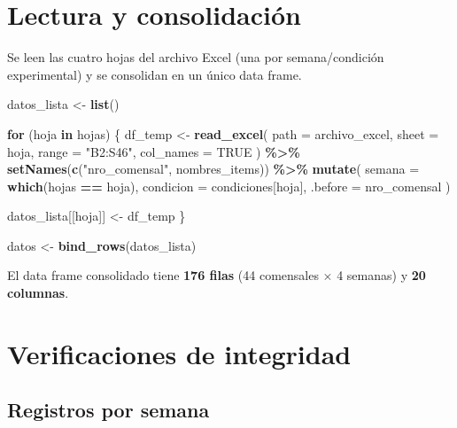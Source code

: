 \documentclass[
  spanish,
]{article}
\newenvironment{Shaded}{\begin{snugshade}}{\end{snugshade}}
\newcommand{\AttributeTok}[1]{\textcolor[rgb]{0.13,0.29,0.53}{#1}}
\newcommand{\ConstantTok}[1]{\textcolor[rgb]{0.56,0.35,0.01}{#1}}
\newcommand{\ControlFlowTok}[1]{\textcolor[rgb]{0.13,0.29,0.53}{\textbf{#1}}}
\newcommand{\FunctionTok}[1]{\textcolor[rgb]{0.13,0.29,0.53}{\textbf{#1}}}
\newcommand{\NormalTok}[1]{#1}
\newcommand{\OtherTok}[1]{\textcolor[rgb]{0.56,0.35,0.01}{#1}}
\newcommand{\SpecialCharTok}[1]{\textcolor[rgb]{0.81,0.36,0.00}{\textbf{#1}}}
\newcommand{\StringTok}[1]{\textcolor[rgb]{0.31,0.60,0.02}{#1}}
\begin{document}
\section{Lectura y consolidación}\label{lectura-y-consolidaciuxf3n}

Se leen las cuatro hojas del archivo Excel (una por semana/condición
experimental) y se consolidan en un único data frame.

\begin{Shaded}
\begin{Highlighting}[]
\NormalTok{datos\_lista }\OtherTok{\textless{}{-}} \FunctionTok{list}\NormalTok{()}

\ControlFlowTok{for}\NormalTok{ (hoja }\ControlFlowTok{in}\NormalTok{ hojas) \{}
\NormalTok{  df\_temp }\OtherTok{\textless{}{-}} \FunctionTok{read\_excel}\NormalTok{(}
    \AttributeTok{path      =}\NormalTok{ archivo\_excel,}
    \AttributeTok{sheet     =}\NormalTok{ hoja,}
    \AttributeTok{range     =} \StringTok{"B2:S46"}\NormalTok{,}
    \AttributeTok{col\_names =} \ConstantTok{TRUE}
\NormalTok{  ) }\SpecialCharTok{\%\textgreater{}\%}
    \FunctionTok{setNames}\NormalTok{(}\FunctionTok{c}\NormalTok{(}\StringTok{"nro\_comensal"}\NormalTok{, nombres\_items)) }\SpecialCharTok{\%\textgreater{}\%}
    \FunctionTok{mutate}\NormalTok{(}
      \AttributeTok{semana    =} \FunctionTok{which}\NormalTok{(hojas }\SpecialCharTok{==}\NormalTok{ hoja),}
      \AttributeTok{condicion =}\NormalTok{ condiciones[hoja],}
      \AttributeTok{.before   =}\NormalTok{ nro\_comensal}
\NormalTok{    )}

\NormalTok{  datos\_lista[[hoja]] }\OtherTok{\textless{}{-}}\NormalTok{ df\_temp}
\NormalTok{\}}

\NormalTok{datos }\OtherTok{\textless{}{-}} \FunctionTok{bind\_rows}\NormalTok{(datos\_lista)}
\end{Highlighting}
\end{Shaded}

El data frame consolidado tiene \textbf{176 filas} (44 comensales
\(\times\) 4 semanas) y \textbf{20 columnas}.

\section{Verificaciones de
integridad}\label{verificaciones-de-integridad}

\subsection{Registros por semana}\label{registros-por-semana}
\end{document}
